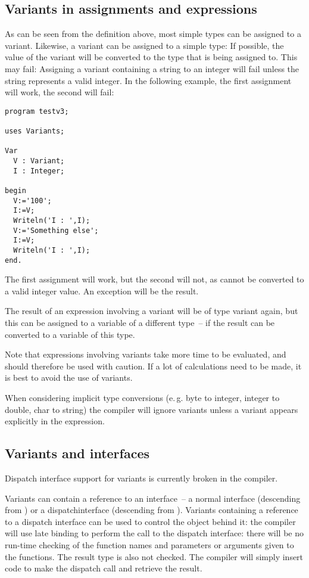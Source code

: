 \subsection{Variants in assignments and expressions}
As can be seen from the definition above, most simple types can be assigned
to a variant. Likewise, a variant can be assigned to a simple type: If
possible, the value of the variant will be converted to the type that is
being assigned to. This may fail: Assigning a variant containing a string
to an integer will fail unless the string represents a valid integer. In the
following example, the first assignment will work, the second will fail:
\begin{verbatim}
program testv3;

uses Variants;

Var
  V : Variant;
  I : Integer;

begin
  V:='100';
  I:=V;
  Writeln('I : ',I);
  V:='Something else';
  I:=V;
  Writeln('I : ',I);
end.
\end{verbatim}
The first assignment will work, but the second will not, as 
cannot be converted to a valid integer value. An  exception
will be the result.

The result of an expression involving a variant will be of type variant again,
but this can be assigned to a variable of a different type~-- if the result
can be converted to a variable of this type.

Note that expressions involving variants take more time to be evaluated, and
should therefore be used with caution. If a lot of calculations need to be
made, it is best to avoid the use of variants.

When considering implicit type conversions (e.\,g. byte to integer, integer to
double, char to string) the compiler will ignore variants unless a variant
appears explicitly in the expression.

\subsection{Variants and interfaces}
\begin{remark}
Dispatch interface support for variants is currently broken in the compiler.
\end{remark}

Variants can contain a reference to an interface~-- a normal interface
(descending from ) or a dispatchinterface (descending
from ). Variants containing a reference to a dispatch
interface can be used to control the object behind it: the compiler will use
late binding to perform the call to the dispatch interface: there will be no
run-time checking of the function names and parameters or arguments given to
the functions. The result type is also not checked. The compiler will simply
insert code to make the dispatch call and retrieve the result.

